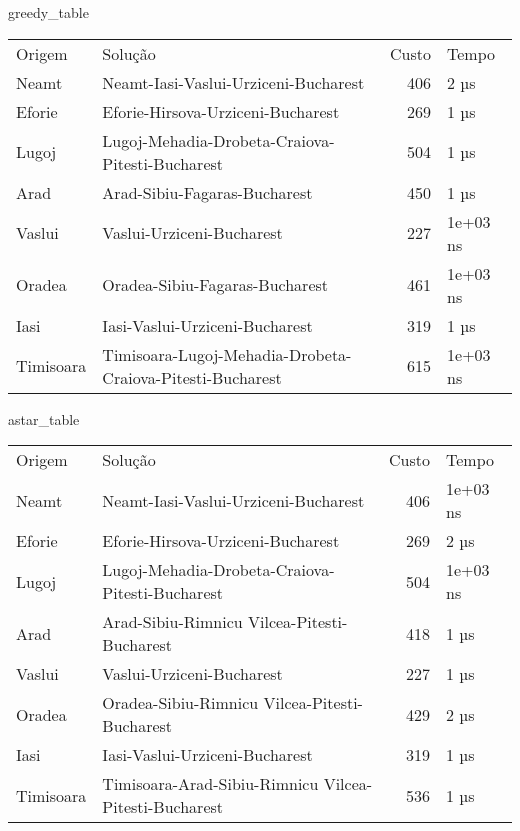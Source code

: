 greedy_table
\begin{tabular}{llrl}
Origem & Solução & Custo & Tempo \\
Neamt & Neamt-Iasi-Vaslui-Urziceni-Bucharest & 406 & 2 µs \\
Eforie & Eforie-Hirsova-Urziceni-Bucharest & 269 & 1 µs \\
Lugoj & Lugoj-Mehadia-Drobeta-Craiova-Pitesti-Bucharest & 504 & 1 µs \\
Arad & Arad-Sibiu-Fagaras-Bucharest & 450 & 1 µs \\
Vaslui & Vaslui-Urziceni-Bucharest & 227 & 1e+03 ns \\
Oradea & Oradea-Sibiu-Fagaras-Bucharest & 461 & 1e+03 ns \\
Iasi & Iasi-Vaslui-Urziceni-Bucharest & 319 & 1 µs \\
Timisoara & Timisoara-Lugoj-Mehadia-Drobeta-Craiova-Pitesti-Bucharest & 615 & 1e+03 ns \\
\end{tabular}

astar_table
\begin{tabular}{llrl}
Origem & Solução & Custo & Tempo \\
Neamt & Neamt-Iasi-Vaslui-Urziceni-Bucharest & 406 & 1e+03 ns \\
Eforie & Eforie-Hirsova-Urziceni-Bucharest & 269 & 2 µs \\
Lugoj & Lugoj-Mehadia-Drobeta-Craiova-Pitesti-Bucharest & 504 & 1e+03 ns \\
Arad & Arad-Sibiu-Rimnicu Vilcea-Pitesti-Bucharest & 418 & 1 µs \\
Vaslui & Vaslui-Urziceni-Bucharest & 227 & 1 µs \\
Oradea & Oradea-Sibiu-Rimnicu Vilcea-Pitesti-Bucharest & 429 & 2 µs \\
Iasi & Iasi-Vaslui-Urziceni-Bucharest & 319 & 1 µs \\
Timisoara & Timisoara-Arad-Sibiu-Rimnicu Vilcea-Pitesti-Bucharest & 536 & 1 µs \\
\end{tabular}

